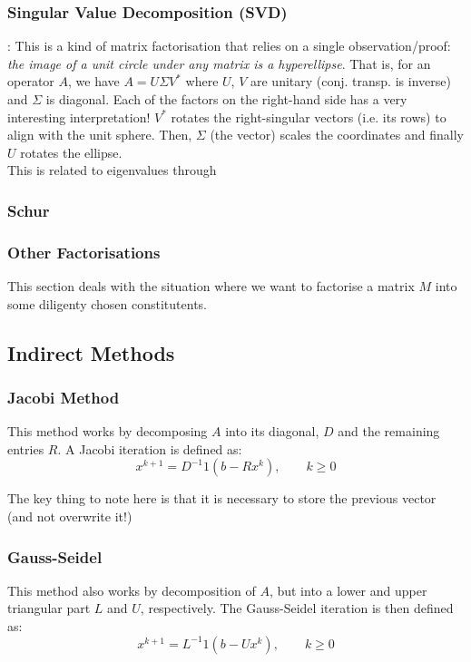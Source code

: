 \subsubsection{Singular Value Decomposition (SVD)}: This is a kind of matrix factorisation that relies on a single observation/proof: \emph{the image of a unit circle under any matrix is a hyperellipse}. That is, for an operator $A$, we have $A = U \Sigma V^*$ where $U$, $V$ are unitary (conj. transp. is inverse) and $\Sigma$ is diagonal.
Each of the factors on the right-hand side has a very interesting interpretation! $V^*$ rotates the right-singular vectors (i.e. its rows) to align with the unit sphere. Then, $\Sigma$ (the vector) scales the coordinates and finally $U$ rotates the ellipse.\\
This is related to eigenvalues through

\subsubsection{Schur}


\subsubsection{Other Factorisations}

This section deals with the situation where we want to factorise a matrix $M$ into
some diligenty chosen constitutents.

\subsection{Indirect Methods}

\subsubsection{Jacobi Method}

This method works by decomposing $A$ into its diagonal, $D$ and the
remaining entries $R$. A Jacobi iteration is defined as:
\[
x^{k+1} = D^{-1}1 (b  - R x^k), \qquad k\geq 0
\]

The key thing to note here is that it is necessary to store the previous
vector (and not overwrite it!)

\subsubsection{Gauss-Seidel}

This method also works by decomposition of $A$, but into a lower and upper
triangular part $L$ and $U$, respectively. The Gauss-Seidel iteration is
then defined as:
\[
x^{k+1} = L^{-1}1 (b  - U x^k), \qquad k\geq 0
\]

